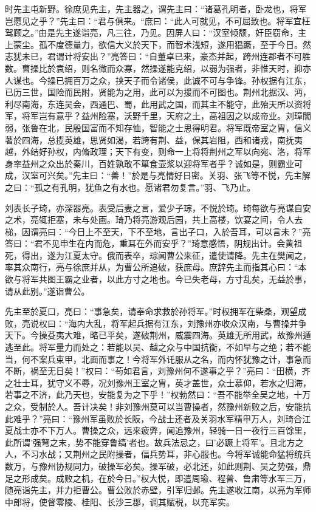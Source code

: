 \documentclass[12pt,UTF8]{ctexbook}
\begin{document}
时先主屯新野。徐庶见先主，先主器之，谓先主曰：“诸葛孔明者，卧龙也，将军岂愿见之乎？”先主曰：“君与俱来。“庶曰：“此人可就见，不可屈致也。将军宜枉驾顾之。”由是先主遂诣亮，凡三往，乃见。因屏人曰：“汉室倾颓，奸臣窃命，主上蒙尘。孤不度德量力，欲信大义於天下，而智术浅短，遂用猖蹶，至于今日。然志犹未已，君谓计将安出？”亮答曰：“自董卓已来，豪杰并起，跨州连郡者不可胜数。曹操比於袁绍，则名微而众寡，然操遂能克绍，以弱为强者，非惟天时，抑亦人谋也。今操已拥百万之众，挟天子而令诸侯，此诚不可与争锋。孙权据有江东，已历三世，国险而民附，贤能为之用，此可以为援而不可图也。荆州北据汉、沔，利尽南海，东连吴会，西通巴、蜀，此用武之国，而其主不能守，此殆天所以资将军，将军岂有意乎？益州险塞，沃野千里，天府之土，高祖因之以成帝业。刘璋闇弱，张鲁在北，民殷国富而不知存恤，智能之士思得明君。将军既帝室之胄，信义著於四海，总揽英雄，思贤如渴，若跨有荆、益，保其岩阻，西和诸戎，南抚夷越，外结好孙权，内脩政理；天下有变，则命一上将将荆州之军以向宛、洛，将军身率益州之众出於秦川，百姓孰敢不箪食壶浆以迎将军者乎？诚如是，则霸业可成，汉室可兴矣。”先主曰：“善！”於是与亮情好日密。关羽、张飞等不悦，先主解之曰：“孤之有孔明，犹鱼之有水也。愿诸君勿复言。”羽、飞乃止。

刘表长子琦，亦深器亮。表受后妻之言，爱少子琮，不悦於琦。琦每欲与亮谋自安之术，亮辄拒塞，未与处画。琦乃将亮游观后园，共上高楼，饮宴之间，令人去梯，因谓亮曰：“今日上不至天，下不至地，言出子口，入於吾耳，可以言未？”亮答曰：“君不见申生在内而危，重耳在外而安乎？”琦意感悟，阴规出计。会黄祖死，得出，遂为江夏太守。俄而表卒，琮闻曹公来征，遣使请降。先主在樊闻之，率其众南行，亮与徐庶并从，为曹公所追破，获庶母。庶辞先主而指其心曰：“本欲与将军共图王霸之业者，以此方寸之地也。今已失老母，方寸乱矣，无益於事，请从此别。”遂诣曹公。

先主至於夏口，亮曰：“事急矣，请奉命求救於孙将军。”时权拥军在柴桑，观望成败，亮说权曰：“海内大乱，将军起兵据有江东，刘豫州亦收众汉南，与曹操并争天下。今操芟夷大难，略已平矣，遂破荆州，威震四海。英雄无所用武，故豫州遁逃至此。将军量力而处之：若能以吴、越之众与中国抗衡，不如早与之绝；若不能当，何不案兵束甲，北面而事之！今将军外讬服从之名，而内怀犹豫之计，事急而不断，祸至无日矣！”权曰：“苟如君言，刘豫州何不遂事之乎？”亮曰：“田横，齐之壮士耳，犹守义不辱，况刘豫州王室之胄，英才盖世，众士慕仰，若水之归海，若事之不济，此乃天也，安能复为之下乎！”权勃然曰：“吾不能举全吴之地，十万之众，受制於人。吾计决矣！非刘豫州莫可以当曹操者，然豫州新败之后，安能抗此难乎？”亮曰：“豫州军虽败於长阪，今战士还者及关羽水军精甲万人，刘琦合江夏战士亦不下万人。曹操之众，远来疲弊，闻追豫州，轻骑一日一夜行三百馀里，此所谓'强弩之末，势不能穿鲁缟'者也。故兵法忌之，曰'必蹶上将军'。且北方之人，不习水战；又荆州之民附操者，偪兵势耳，非心服也。今将军诚能命猛将统兵数万，与豫州协规同力，破操军必矣。操军破，必北还，如此则荆、吴之势强，鼎足之形成矣。成败之机，在於今日。”权大悦，即遣周瑜、程普、鲁肃等水军三万，随亮诣先主，并力拒曹公。曹公败於赤壁，引军归邺。先主遂收江南，以亮为军师中郎将，使督零陵、桂阳、长沙三郡，调其赋税，以充军实。
\end{document}
